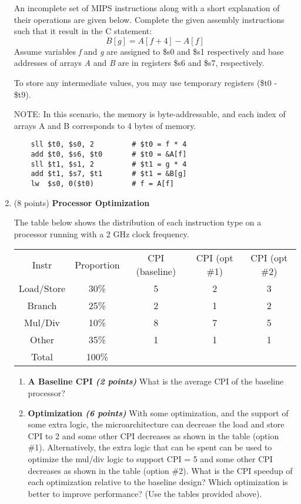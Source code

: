 \documentclass[a4paper,10pt]{article}
\begin{document}
\begin{enumerate}
An incomplete set of MIPS instructions along with a short explanation of their operations are given below. Complete the given assembly instructions such that it result in the C statement: $$B[g] = A[f + 4] - A[f]$$ 
Assume variables \textit{f} and \textit{g} are assigned to \$s0 and \$s1 respectively and base addresses of arrays \textit{A} and \textit{B} are in registers \$s6 and \$s7, respectively. 

To store any intermediate values, you may use temporary registers (\$t0 - \$t9).

NOTE: In this scenario, the memory is byte-addressable, and each index of arrays A and B corresponds to 4 bytes of memory.

\begin{verbatim}
    sll $t0, $s0, 2         # $t0 = f * 4
    add $t0, $s6, $t0       # $t0 = &A[f]
    sll $t1, $s1, 2         # $t1 = g * 4
    add $t1, $s7, $t1       # $t1 = &B[g]
    lw  $s0, 0($t0)         # f = A[f]
\end{verbatim}
    
\vspace{\baselineskip}
\begin{comment}
    QUESTION 4
\end{comment}

\item (8 points) \textbf{Processor Optimization}

The table below shows the distribution of each instruction type on a processor running with a 2 GHz clock frequency.
\begin{center}
\begin{tabular}{ c c c c c}
Instr &	Proportion	& CPI (baseline) & CPI (opt \#1) & CPI (opt \#2) \\ 
Load/Store & 30\% & 5 & 2 & 3 \\ 
Branch & 25\% & 2 & 1 & 2 \\  
Mul/Div	& 10\% & 8 & 7 & 5 \\ 
Other & 35\% & 1 & 1 & 1 \\
Total & 100\%
\end{tabular}
\end{center}

\begin{enumerate}
    \item \textbf{A Baseline CPI \textit{(2 points)}}
    What is the average CPI of the baseline processor?
    
    \item \textbf{Optimization \textit{(6 points)}}
    With some optimization, and the support of some extra logic, the microarchitecture can decrease the load and store CPI to 2 and some other CPI decreases as shown in the table (option \#1). Alternatively, the extra logic that can be spent can be used to optimize the mul/div logic to support CPI = 5 and some other CPI decreases as shown in the table (option \#2). What is the CPI speedup of each optimization relative to the baseline design? Which optimization is better to improve performance? (Use the tables provided above).
    

\end{enumerate}
\end{enumerate}
\end{document}
